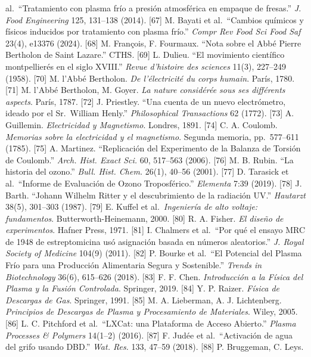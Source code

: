 \documentclass[
  11pt,
  letterpaper,
]{article}
\begin{document}
al.~``Tratamiento con plasma frío a presión atmosférica en empaque de
fresas.'' \emph{J. Food Engineering} 125, 131--138 (2014). {[}67{]} M.
Bayati et al.~``Cambios químicos y físicos inducidos por tratamiento con
plasma frío.'' \emph{Compr Rev Food Sci Food Saf} 23(4), e13376 (2024).
{[}68{]} M. François, F. Fourmaux. ``Nota sobre el Abbé Pierre Bertholon
de Saint Lazare.'' CTHS. {[}69{]} L. Dulieu. ``El movimiento científico
montpellierés en el siglo XVIII.'' \emph{Revue d'histoire des sciences}
11(3), 227--249 (1958). {[}70{]} M. l'Abbé Bertholon. \emph{De
l'électricité du corps humain}. París, 1780. {[}71{]} M. l'Abbé
Bertholon, M. Goyer. \emph{La nature considérée sous ses différents
aspects}. París, 1787. {[}72{]} J. Priestley. ``Una cuenta de un nuevo
electrómetro, ideado por el Sr.~William Henly.'' \emph{Philosophical
Transactions} 62 (1772). {[}73{]} A. Guillemin. \emph{Electricidad y
Magnetismo}. Londres, 1891. {[}74{]} C. A. Coulomb. \emph{Memorias sobre
la electricidad y el magnetismo}. Segunda memoria, pp.~577--611 (1785).
{[}75{]} A. Martinez. ``Replicación del Experimento de la Balanza de
Torsión de Coulomb.'' \emph{Arch. Hist. Exact Sci.} 60, 517--563 (2006).
{[}76{]} M. B. Rubin. ``La historia del ozono.'' \emph{Bull. Hist.
Chem.} 26(1), 40--56 (2001). {[}77{]} D. Tarasick et al.~``Informe de
Evaluación de Ozono Troposférico.'' \emph{Elementa} 7:39 (2019).
{[}78{]} J. Barth. ``Johann Wilhelm Ritter y el descubrimiento de la
radiación UV.'' \emph{Hautarzt} 38(5), 301--303 (1987). {[}79{]} E.
Kuffel et al.~\emph{Ingeniería de alto voltaje: fundamentos}.
Butterworth-Heinemann, 2000. {[}80{]} R. A. Fisher. \emph{El diseño de
experimentos}. Hafner Press, 1971. {[}81{]} I. Chalmers et al.~``Por qué
el ensayo MRC de 1948 de estreptomicina usó asignación basada en números
aleatorios.'' \emph{J. Royal Society of Medicine} 104(9) (2011).
{[}82{]} P. Bourke et al.~``El Potencial del Plasma Frío para una
Producción Alimentaria Segura y Sostenible.'' \emph{Trends in
Biotechnology} 36(6), 615--626 (2018). {[}83{]} F. F. Chen.
\emph{Introducción a la Física del Plasma y la Fusión Controlada}.
Springer, 2019. {[}84{]} Y. P. Raizer. \emph{Física de Descargas de
Gas}. Springer, 1991. {[}85{]} M. A. Lieberman, A. J. Lichtenberg.
\emph{Principios de Descargas de Plasma y Procesamiento de Materiales}.
Wiley, 2005. {[}86{]} L. C. Pitchford et al.~``LXCat: una Plataforma de
Acceso Abierto.'' \emph{Plasma Processes \& Polymers} 14(1--2) (2016).
{[}87{]} F. Judée et al.~``Activación de agua del grifo usando DBD.''
\emph{Wat. Res.} 133, 47--59 (2018). {[}88{]} P. Bruggeman, C. Leys.
\end{document}
